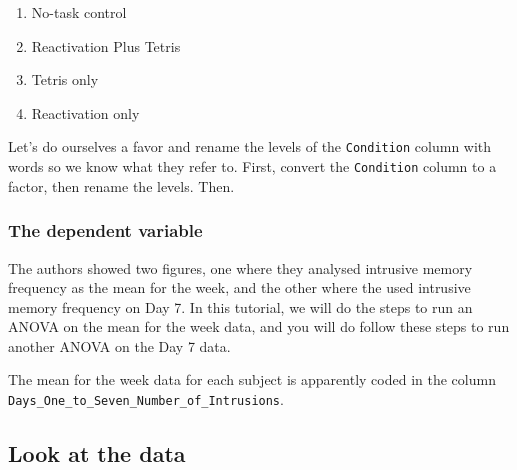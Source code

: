 \documentclass[]{book}
\newenvironment{Shaded}{\begin{snugshade}}{\end{snugshade}}
\newcommand{\KeywordTok}[1]{\textcolor[rgb]{0.13,0.29,0.53}{\textbf{#1}}}
\newcommand{\StringTok}[1]{\textcolor[rgb]{0.31,0.60,0.02}{#1}}
\newcommand{\OperatorTok}[1]{\textcolor[rgb]{0.81,0.36,0.00}{\textbf{#1}}}
\newcommand{\NormalTok}[1]{#1}
\providecommand{\tightlist}{%
  \setlength{\itemsep}{0pt}\setlength{\parskip}{0pt}}
\begin{document}
\begin{enumerate}
\def\labelenumi{\arabic{enumi}.}
\tightlist
\item
  No-task control
\item
  Reactivation Plus Tetris
\item
  Tetris only
\item
  Reactivation only
\end{enumerate}

Let's do ourselves a favor and rename the levels of the
\texttt{Condition} column with words so we know what they refer to.
First, convert the \texttt{Condition} column to a factor, then rename
the levels. Then.

\begin{Shaded}
\end{Shaded}

\subsubsection{The dependent variable}\label{the-dependent-variable}

The authors showed two figures, one where they analysed intrusive memory
frequency as the mean for the week, and the other where the used
intrusive memory frequency on Day 7. In this tutorial, we will do the
steps to run an ANOVA on the mean for the week data, and you will do
follow these steps to run another ANOVA on the Day 7 data.

The mean for the week data for each subject is apparently coded in the
column \texttt{Days\_One\_to\_Seven\_Number\_of\_Intrusions}.

\subsection{Look at the data}\label{look-at-the-data-2}
\end{document}
